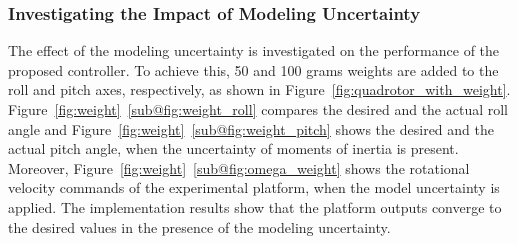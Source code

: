 \documentclass[3p]{elsarticle}
\begin{document}
\subsubsection{Investigating the Impact of Modeling Uncertainty}\label{sec:model-uncertainty}
\noindent The effect of the modeling uncertainty is investigated on the performance of the proposed controller.
To achieve this, 50 and 100 grams weights are added to the roll and pitch axes, respectively, as shown in Figure~\ref{fig:quadrotor_with_weight}.
Figure~\ref{fig:weight}~\ref{sub@fig:weight_roll} compares the desired and the actual roll angle and Figure~\ref{fig:weight}~\ref{sub@fig:weight_pitch} shows the desired and the actual pitch angle, when the uncertainty of moments of inertia is present.
Moreover, Figure~\ref{fig:weight}~\ref{sub@fig:omega_weight} shows the rotational velocity commands of the experimental platform, when the model uncertainty is applied.
The implementation results show that the platform outputs converge to the desired values in the presence of the modeling uncertainty.
\end{document}
